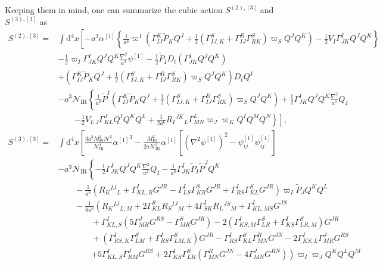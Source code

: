 \documentclass[aps, prd
, preprint
, nofootinbib 
, notitlepage
, longbibliography
]{revtex4-1}
\newcommand{\dd}{\mathrm{d}}
\newcommand{\Mpl}{M_\text{Pl}}
\newcommand{\IR}{\text{IR}}
\newcommand{\calH}{\mathcal{H}}
\newcommand{\calN}{\mathcal{N}}
\newcommand{\bae}[1]{\begin{align} #1 \end{align}}
\begin{document}
Keeping them in mind, one can summarize the cubic action $S^{(2),[3]}$ and $S^{(3),[3]}$ as
\bae{
    S^{(2),[3]}=&\int\dd^4x\left[-a^3\alpha^{[1]}\left\{\frac{1}{a^6}\varpi^I\left(\Gamma^K_{IJ}\tilde{P}_KQ^J+\frac{1}{2}(\Gamma^S_{IJ,K}+\Gamma^R_{IJ}\Gamma^S_{RK})\varpi_SQ^JQ^K\right)-\frac{1}{2}V_I\Gamma^I_{JK}Q^JQ^K\right\} \right. \nonumber \\
    &-\frac{1}{2}\varpi_I\Gamma^I_{JK}Q^JQ^K\frac{\nabla^2}{a^2}\psi^{[1]}
    -\frac{1}{2}\tilde{P}_ID_t(\Gamma^I_{JK}Q^JQ^K) \nonumber \\
    &+\left(\Gamma^K_{IJ}\tilde{P}_KQ^J+\frac{1}{2}(\Gamma^S_{IJ,K}+\Gamma^R_{IJ}\Gamma^S_{RK})\varpi_SQ^JQ^K\right)D_tQ^I \nonumber \\
    &-a^3\calN_\IR\left\{\frac{1}{a^6}\tilde{P}^I\left(\Gamma^K_{IJ}\tilde{P}_KQ^J+\frac{1}{2}(\Gamma^S_{IJ,K}+\Gamma^R_{IJ}\Gamma^S_{RK})\varpi_SQ^JQ^K\right)+\frac{1}{2}\Gamma^I_{JK}Q^JQ^K\frac{\nabla^2}{a^2}Q_I \right. \nonumber \\
    &\qquad\left.\left.-\frac{1}{2}V_{I;J}\Gamma^J_{KL}Q^IQ^KQ^L+\frac{1}{2a^6}R_I{}^{JK}{}_L\Gamma^L_{MN}\varpi_J\varpi_KQ^IQ^MQ^N\right\}\right], \\
    S^{(3),[3]}=&\int\dd^4x\left[\frac{3a^3\Mpl^2\calH^2}{\calN_\IR^4}{\alpha^{[1]}}^3-\frac{\Mpl^2}{2a\calN_\IR^2}\alpha^{[1]}[(\nabla^2\psi^{[1]})^2-\psi^{[1]}_{ij}\psi^{[1]}_{ij}] \right. \nonumber \\
	&-a^3\calN_\IR\left\{-\frac{1}{2}\Gamma^I_{JK}Q^JQ^K\frac{\nabla^2}{a^2}Q_I-\frac{1}{a^6}\Gamma^I_{JK}\tilde{P}_I\tilde{P}^JQ^K \right. \nonumber \\
    &\qquad
    -\frac{1}{a^6}\left(R_K{}^{IJ}{}_L+\Gamma^I_{KL,R}G^{JR}-\Gamma^I_{LS}\Gamma^S_{KR}G^{JR}+\Gamma^I_{RS}\Gamma^S_{KL}G^{JR}\right)\varpi_I\tilde{P}_JQ^KQ^L \nonumber \\
    &\qquad-\frac{1}{6a^6}\left(R_K{}^{IJ}{}_{L;M}+2\Gamma^S_{KL}R_S{}^{IJ}{}_M+4\Gamma^I_{SK}R_L{}^{JS}{}_M+\Gamma^I_{KL,MS}G^{JS} \right. \nonumber \\
    &\qquad\qquad+\Gamma^I_{KL,S}(5\Gamma^J_{MR}G^{RS}-\Gamma^S_{MR}G^{JR})
    -2(\Gamma^I_{KS,M}\Gamma^S_{LR}+\Gamma^I_{KS}\Gamma^S_{LR,M})G^{JR} \nonumber \\
    &\qquad\qquad
    +(\Gamma^I_{RS,K}\Gamma^S_{LM}+\Gamma^I_{RS}\Gamma^S_{LM,K})G^{JR}-\Gamma^I_{RS}\Gamma^S_{KL}\Gamma^R_{MN}G^{JN}-2\Gamma^I_{KS,L}\Gamma^J_{MR}G^{RS} \nonumber \\
    &\qquad\qquad
    \left.+5\Gamma^I_{KL,S}\Gamma^J_{RM}G^{RS}
    +2\Gamma^I_{KS}\Gamma^S_{LR}(\Gamma^R_{MN}G^{JN}-4\Gamma^J_{MN}G^{RN})\right)\varpi_I\varpi_JQ^KQ^LQ^M \nonumber \\
}
\end{document}
